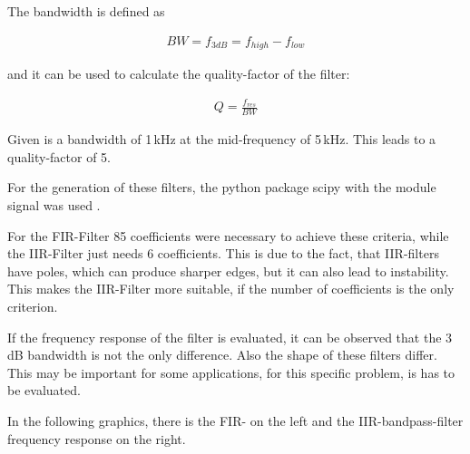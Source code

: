The bandwidth is defined as

\begin{align}
    BW = f_{3dB} = f_{high} - f_{low}
\end{align}

and it can be used to calculate the quality-factor of the filter:

\begin{align}
    Q = \frac{f_{res}}{BW}
    \label{eq:q-factor}
\end{align}

Given is a bandwidth of 1\,kHz at the mid-frequency of 5\,kHz. This leads to a quality-factor of 5.


For the generation of these filters, the python package \frqq scipy\flqq{} with the module \frqq signal\flqq{} was used
\cite{scipy}.

For the \ac{FIR}-Filter 85 coefficients were necessary to achieve these criteria, while the
\ac{IIR}-Filter just needs 6 coefficients. This is due to the fact, that \ac{IIR}-filters have poles, which
can produce sharper edges, but it can also lead to instability. This makes the \ac{IIR}-Filter more suitable,
if the number of coefficients is the only criterion.

If the frequency response of the filter is evaluated, it can be observed that the 3\,dB bandwidth
is not the only difference. Also the shape of these filters differ. This may be important for some
applications, for this specific problem, is has to be evaluated.

In the following graphics, there is the \ac{FIR}- on the left and the \ac{IIR}-bandpass-filter frequency
response on the right.

